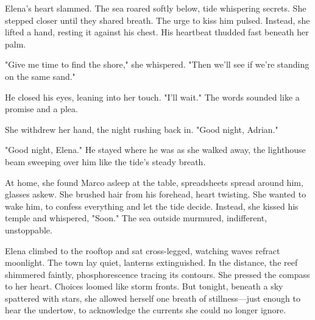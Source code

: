 Elena's heart slammed. The sea roared softly below, tide whispering secrets. She stepped closer until they shared breath. The urge to kiss him pulsed. Instead, she lifted a hand, resting it against his chest. His heartbeat thudded fast beneath her palm.

"Give me time to find the shore," she whispered. "Then we'll see if we're standing on the same sand."

He closed his eyes, leaning into her touch. "I'll wait." The words sounded like a promise and a plea.

She withdrew her hand, the night rushing back in. "Good night, Adrian."

"Good night, Elena." He stayed where he was as she walked away, the lighthouse beam sweeping over him like the tide's steady breath.

At home, she found Marco asleep at the table, spreadsheets spread around him, glasses askew. She brushed hair from his forehead, heart twisting. She wanted to wake him, to confess everything and let the tide decide. Instead, she kissed his temple and whispered, "Soon." The sea outside murmured, indifferent, unstoppable.

Elena climbed to the rooftop and sat cross-legged, watching waves refract moonlight. The town lay quiet, lanterns extinguished. In the distance, the reef shimmered faintly, phosphorescence tracing its contours. She pressed the compass to her heart. Choices loomed like storm fronts. But tonight, beneath a sky spattered with stars, she allowed herself one breath of stillness—just enough to hear the undertow, to acknowledge the currents she could no longer ignore.

